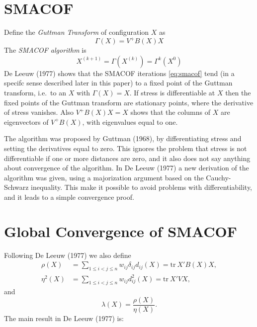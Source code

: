 \documentclass[
  12pt,
]{article}
\begin{document}
\section{SMACOF}\label{smacof}

Define the \emph{Guttman Transform} of configuration \(X\) as
\begin{equation}
\Gamma(X)=V^+B(X)X
\label{eq:guttman}
\end{equation}
The \emph{SMACOF algorithm} is
\begin{equation}
X^{(k+1)}=\Gamma(X^{(k)})=\Gamma^k(X^{0})
\label{eq:smacof}
\end{equation}
De Leeuw (1977) shows that the SMACOF iterations \eqref{eq:smacof} tend (in a specifc sense described later in this paper) to a fixed point of the Guttman transform, i.e.~to an \(X\) with \(\Gamma(X)=X\). If stress is differentiable at \(X\) then the fixed points of the Guttman transform are stationary points, where the derivative of stress vanishes. Also \(V^+B(X)X=X\) shows that the columns of \(X\) are eigenvectors of \(V^+B(X)\), with eigenvalues equal to one.

The algorithm was proposed by Guttman (1968), by differentiating stress and setting the derivatives equal to zero. This ignores the problem that stress is not differentiable if one or more distances are zero, and it also does not say anything about convergence of the algorithm. In De Leeuw (1977) a new derivation of the algorithm was given, using a majorization argument based on the Cauchy-Schwarz inequality. This make it possible to avoid problems with differentiability, and it leads to a simple convergence proof.

\section{Global Convergence of SMACOF}\label{global-convergence-of-smacof}

Following De Leeuw (1977) we also define
\begin{align}
\rho(X)&=\mathop{\sum}_{1\leq i<j\leq n} w_{ij}\delta_{ij}d_{ij}(X)=\text{tr}\ X'B(X)X,\\
\eta^2(X)&=\mathop{\sum}_{1\leq i<j\leq n} w_{ij}d_{ij}^2(X)=\text{tr}\ X'VX,
\end{align}
and
\begin{equation}
\lambda(X)=\frac{\rho(X)}{\eta(X)}.
\end{equation}
The main result in De Leeuw (1977) is:
\end{document}
